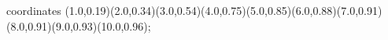 					coordinates { (1.0,0.19)(2.0,0.34)(3.0,0.54)(4.0,0.75)(5.0,0.85)(6.0,0.88)(7.0,0.91)(8.0,0.91)(9.0,0.93)(10.0,0.96)};